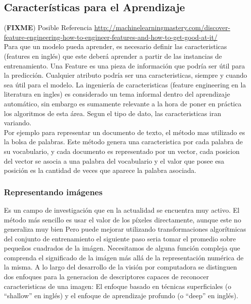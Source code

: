 \documentclass[a4paper,11pt,spanish]{book}
\newcommand*{\FIXME}[1]{{(\textbf{FIXME}) {#1}}}
\begin{document}
    \subsection{Características para el Aprendizaje}
      \FIXME{Posible Referencia \url{http://machinelearningmastery.com/discover-feature-engineering-how-to-engineer-features-and-how-to-get-good-at-it/}}\\
      Para que un modelo pueda aprender, es necesario definir las caracteristicas (features en inglés) que este deberá aprender a partir de las instancias de entrenamiento.
      Una Feature es una pieza de información que podría ser útil para la predicción. Cualquier atributo podría ser una caracteristicas, siempre y cuando sea útil para el modelo.
      La ingeniería de caracteristicas (feature engineering en la literatura en ingles) es considerado un tema informal dentro del aprendizaje automático, sin embargo es sumamente
      relevante a la hora de poner en práctica los algoritmos de esta área.
      Segun el tipo de dato, las caracteristicas iran variando. \\
      Por ejemplo para representar un documento de texto, el método mas utilizado es la bolsa de palabras.
      Este método genera una caracteristica por cada palabra de su vocabulario, y cada documento es representado por un vector, cada posicion del vector se asocia a una palabra del 
      vocabulario y el valor que posee esa posición es la cantidad de veces que aparece la palabra asociada.

      \subsubsection{Representando imágenes}
	Es un campo de investigación que en la actualidad se encuentra muy activo. El método más sencillo es usar el valor de los píxeles directamente, aunque este no generaliza muy bien
	Pero puede mejorar utilizando transformaciones algorítmicas del conjunto de entrenamiento el siguiente paso seria tomar el promedio sobre pequeños cuadrados de la imágen.
	Necesitamos de alguna función compleja que comprenda el significado de la imágen más allá de la representación numérica de la misma.
	A lo largo del desarrollo de la visión por computadora se distinguen dos enfoques para la generacion de descriptores capaces de reconocer caracteristicas de una imagen: 
	El enfoque basado en técnicas superficiales (o “shallow” en inglés) y el enfoque de aprendizaje profundo (o “deep” en inglés).
	
\end{document}
